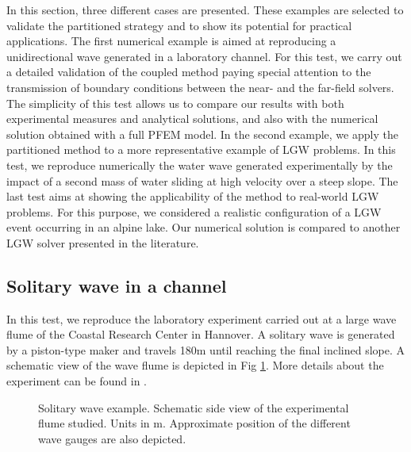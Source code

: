In this section, three different cases are presented. These examples are selected to validate the partitioned strategy and to show its potential for practical applications. The first numerical example is aimed at reproducing a unidirectional wave generated in a laboratory channel. For this test, we carry out a detailed validation of the coupled method paying special attention to the transmission of boundary conditions between the near- and the far-field solvers. The simplicity of this test allows us to compare our results with both experimental measures and analytical solutions, and also with the numerical solution obtained with a full PFEM model. In the second example, we apply the partitioned method to a more representative example of LGW problems.  In this test, we reproduce numerically the water wave generated experimentally by the impact of a second mass of water sliding at high velocity over a steep slope. The last test aims at showing the applicability of the method to real-world LGW problems. For this purpose, we considered a realistic configuration of a LGW event occurring in an alpine lake. Our numerical solution is compared to another LGW solver presented in the literature.



\subsection{Solitary wave in a channel}
\label{Example1}

In this test, we reproduce the laboratory experiment carried out at a large wave flume of the Coastal Research Center in Hannover. A solitary wave is generated by a piston-type maker and travels 180m until reaching the final inclined slope. A schematic view of the wave flume is depicted in Fig \ref{solitary_wave_channel}. More details about the experiment can be found in \cite{krautwald2020,krautwald2022,krautwald2021}.

\begin{figure} [htb]
    \centering
    \caption{Solitary wave example. Schematic side view of the experimental flume studied. Units in m. Approximate position of the different wave gauges are also depicted.}
    \label{solitary_wave_channel}
\end{figure}

